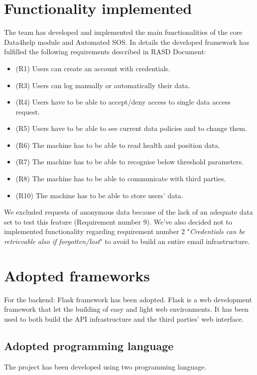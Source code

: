 \documentclass{article}
\begin{document}
\section{Functionality implemented}
The team has developed and implemented the main functionalities of the core Data4help module and Automated SOS.
In details the developed framework has fulfilled the following requirements described in RASD Document:
\begin{itemize}
	\item (R1) Users can create an account with credentials.
	\item (R3) Users can log manually or automatically their data.
	\item (R4) Users have to be able to accept/deny access to single data access request.
	\item (R5) Users have to be able to see current data policies and to change them.
	\item (R6) The machine has to be able to read health and position data.
	\item (R7) The machine has to be able to recognise below threshold parameters.
	\item (R8) The machine has to be able to communicate with third parties.
	\item (R10) The machine has to be able to store users’ data.
\end{itemize}

We excluded requests of anonymous data because of the lack of an adequate data set to test this feature (Requirement number 9).
We've also decided not to implemented functionality regarding requirement number 2 "\textit{Credentials can be retrievable also if forgotten/lost}" to avoid to build an entire email infrastructure.

\section{Adopted frameworks}
For the backend: Flask framework has been adopted. Flask is a web development framework that let the building of easy and light web environments. It has been used to both build the API infrastructure and the third parties' web interface.
\subsection{Adopted programming language}

The project has been developed using two programming language. 
\end{document}
